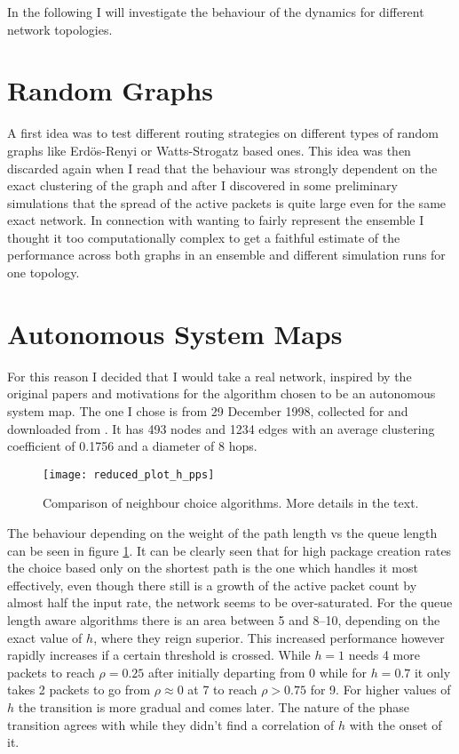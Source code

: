 In the following I will investigate the behaviour of the dynamics for different network topologies.

\section{Random Graphs}
A first idea was to test different routing strategies on different types of random graphs like Erdös-Renyi or Watts-Strogatz based ones.
This idea was then discarded again when I read that the behaviour was strongly dependent on the exact clustering of the graph\cite[p.~2]{Echenique2005} and after I discovered in some preliminary simulations that the spread of the active packets is quite large even for the same exact network.
In connection with wanting to fairly represent the ensemble I thought it too computationally complex to get a faithful estimate of the performance across both graphs in an ensemble and different simulation runs for one topology.

\section{Autonomous System Maps}\label{sec:ASmaps-16}
For this reason I decided that I would take a real network, inspired by the original papers and motivations for the algorithm chosen to be an autonomous system map.
The one I chose is from 29 December 1998, collected for \cite{OregonAS} and downloaded from \cite{snapnets}.
It has \num{493} nodes and \num{1234} edges with an average clustering coefficient of \num{0.1756} and a diameter of \num{8} hops.

\begin{figure}[h]
	\centering
	\texttt{[image: reduced\_plot\_h\_pps]}
	\caption{Comparison of neighbour choice algorithms. More details in the text.}
	\label{fig:neighbour-16}
\end{figure}

The behaviour depending on the weight of the path length vs the queue length can be seen in figure \ref{fig:neighbour-16}.
It can be clearly seen that for high package creation rates the choice based only on the shortest path is the one which handles it most effectively, even though there still is a growth of the active packet count by almost half the input rate, the network seems to be over-saturated.
For the queue length aware algorithms there is an area between \SI{5}{\pps} and \SIrange{8}{10}{\pps}, depending on the exact value of $h$, where they reign superior.
This increased performance however rapidly increases if a certain threshold is crossed.
While $h=1$ needs \num{4} more packets to reach $\rho=\num{0.25}$ after initially departing from \num{0} while for $h=0.7$ it only takes \num{2} packets to go from $\rho\approx\num{0}$ at \SI{7}{\pps} to reach $\rho>\num{0.75}$ for \SI{9}{\pps}. For higher values of $h$ the transition is more gradual and comes later.
The nature of the phase transition agrees with \cite{Echenique2005} while they didn't find a correlation of $h$ with the onset of it.

